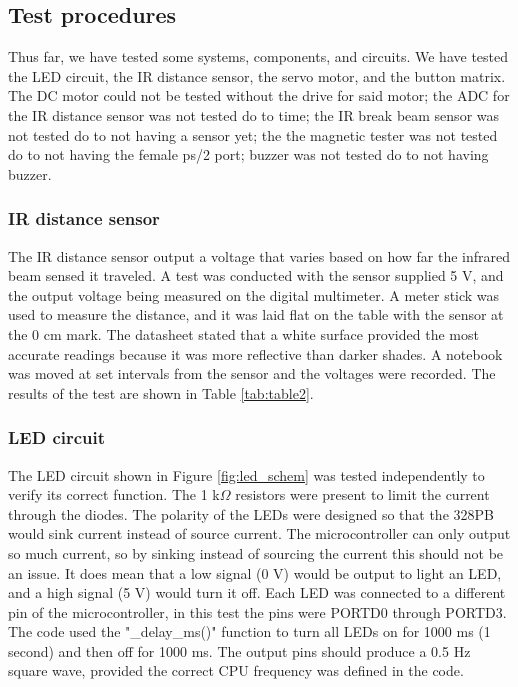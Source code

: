 \documentclass{article}
\begin{document}
        \subsection{Test procedures}
        Thus far, we have tested some systems, components, and circuits. We have tested the LED circuit, the IR distance sensor, the servo motor, and the button matrix. The DC motor could not be tested without the drive for said motor; the ADC for the IR distance sensor was not tested do to time; the IR break beam sensor was not tested do to not having a sensor yet; the the magnetic tester was not tested do to not having the female ps/2 port; buzzer was not tested do to not having buzzer.
        
        \subsubsection{IR distance sensor}
         The IR distance sensor output a voltage that varies based on how far the infrared beam sensed it traveled. A test was conducted with the sensor supplied 5 V, and the output voltage being measured on the digital multimeter. A meter stick was used to measure the distance, and it was laid flat on the table with the sensor at the 0 cm mark. The datasheet\cite{project_overview:IR_datasheet} stated that a white surface provided the most accurate readings because it was more reflective than darker shades. A notebook was moved at set intervals from the sensor and the voltages were recorded. The results of the test are shown in Table \ref{tab:table2}.
        
        \subsubsection{LED circuit}
        The LED circuit shown in Figure \ref{fig:led_schem} was tested independently to verify its correct function. The 1 k$\Omega$ resistors were present to limit the current through the diodes. The polarity of the LEDs were designed so that the 328PB would sink current instead of source current. The microcontroller can only output so much current, so by sinking instead of sourcing the current this should not be an issue. It does mean that a low signal (0 V) would be output to light an LED, and a high signal (5 V) would turn it off. Each LED was connected to a different pin of the microcontroller, in this test the pins were PORTD0 through PORTD3. The code used the "\_delay\_ms()" function to turn all LEDs on for 1000 ms (1 second) and then off for 1000 ms. The output pins should produce a 0.5 Hz square wave, provided the correct CPU frequency was defined in the code.
        
\end{document}
